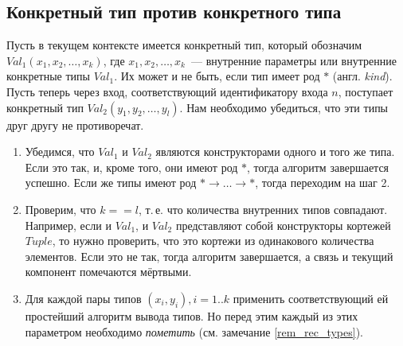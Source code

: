 \label{rem_rec_types}

\label{rem_fur_prop}

\subsection{Конкретный тип против конкретного типа}\label{valueVSvalue}
Пусть в текущем контексте имеется конкретный тип, который обозначим $Val_1 (x_1, x_2, \ldots, x_k)$, где $x_1, x_2, \ldots, x_k$~--- внутренние параметры или внутренние конкретные типы $Val_1$. Их может и не быть, если тип имеет род $*$ (англ. \textit{kind}). Пусть теперь через вход, соответствующий идентификатору входа $n$, поступает конкретный тип $Val_2 (y_1, y_2, \ldots, y_l)$. Нам необходимо убедиться, что эти типы друг другу не противоречат.
\begin{enumerate}
	\item Убедимся, что $Val_1$ и $Val_2$ являются конструкторами одного и того же типа. Если это так, и, кроме того, они имеют род $*$, тогда алгоритм завершается успешно. Если же типы имеют род $* \rightarrow \ldots \rightarrow *$, тогда переходим на шаг 2.
	\item Проверим, что $k == l$, т.\,е. что количества внутренних типов совпадают. Например, если и $Val_1$, и $Val_2$ представляют собой конструкторы кортежей $Tuple$, то нужно проверить, что это кортежи из одинакового количества элементов. Если это не так, тогда алгоритм завершается, а связь и текущий компонент помечаются мёртвыми.
	\item Для каждой пары типов $(x_i, y_i), i = 1 .. k$ применить соответствующий ей простейший алгоритм вывода типов.	Но перед этим каждый из этих параметром необходимо \textit{пометить} (см. замечание \ref{rem_rec_types}).
\end{enumerate}

